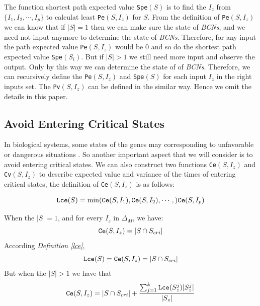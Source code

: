 The function shortest path  expected value {\tt Spe}$(S)$ is to find the $I_z$ from $\{I_1,I_2,\cdots, I_p\}$ to calculat least {\tt Pe}$(S, I_z)$ for $S$. From the definition of {\tt Pe}$(S, I_z)$ we can know that if $|S|=1$ then we can make sure the state of {\em BCNs}, and we need not input anymore to determine the state of {\em BCNs}. Therefore, for any input the path expected value {\tt Pe}$(S, I_z)$ would be $0$ and so do the shortest path  expected value {\tt Spe}$(S_i)$. But if $|S|>1$ we still need more input and observe the output. Only by this way we can determine the state of of {\em BCNs}. Therefore,  we can recursively define the {\tt Pe}$(S, I_z)$ and {\tt Spe}$(S)$ for each input $I_z$ in the right inputs set.  The {\tt Pv}$(S, I_z)$ can be defined in the similar way. Hence we omit the details in this paper. 

\subsection{Avoid Entering Critical States}
In biological systems, some states of the genes may corresponding to unfavorable or dangerous situations \cite{Li2014Controllability}. So another important aspect that we will consider is to avoid entering critical states. We can also construct two functions {\tt Ce}$(S, I_z)$ and {\tt Cv}$(S, I_z)$ to describe expected value and variance of the times of entering critical states, the definition of {\tt Ce}$(S, I_z)$ is as follows:\\
\begin{definition}[{\tt Lce}$(S)$] \label{lce}
\[{\tt Lce}(S)= \min({\tt Ce}(S, I_1),{\tt Ce}(S, I_2),\cdots,){\tt Ce}(S, I_p)\]
\end{definition}
\begin{definition}[{\tt Ce}$(S, I_z)$] 
When the $|S|=1$, and for every $I_z$ in $\Delta_M$, we have: \[{\tt Ce}(S, I_z)=|S \cap S_{cri} |\] 
According {\em Definition \ref{lce}}, %
\[{\tt Lce}(S)={\tt Ce}(S, I_z)=|S \cap S_{cri} |\] 
But when the $|S|>1$ 
we have that 
\[{\tt Ce}(S, I_z)=|S \cap S_{cri} | +\frac{\sum_{j=1}^k {\tt Lce}(S_z^j)|S_z^j|}{ |S_z|} \] 
\end{definition}

